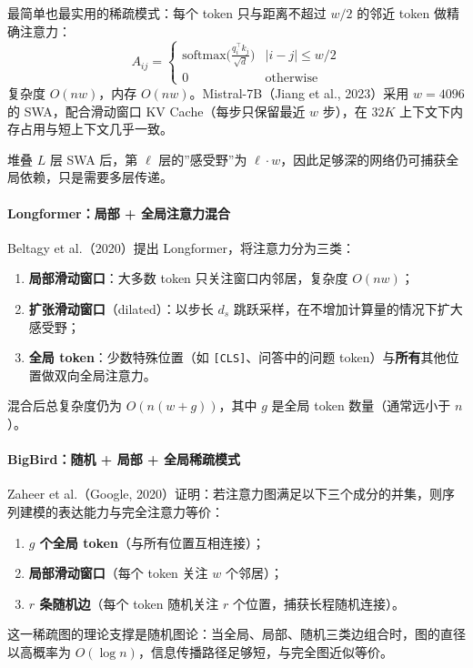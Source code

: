 \documentclass[12pt,a4paper]{article}
\begin{document}
最简单也最实用的稀疏模式：每个 token 只与距离不超过 $w/2$ 的邻近 token 做精确注意力：
\begin{equation}
A_{ij} = \begin{cases}
\mathrm{softmax}\!\bigl(\tfrac{q_i^\top k_j}{\sqrt{d}}\bigr) & |i-j| \le w/2\\
0 & \text{otherwise}
\end{cases}
\end{equation}
复杂度 $O(nw)$，内存 $O(nw)$。Mistral-7B（Jiang et al., 2023）采用 $w=4096$ 的 SWA，配合滑动窗口 KV Cache（每步只保留最近 $w$ 步），在 $32K$ 上下文下内存占用与短上下文几乎一致。

堆叠 $L$ 层 SWA 后，第 $\ell$ 层的”感受野”为 $\ell \cdot w$，因此足够深的网络仍可捕获全局依赖，只是需要多层传递。

\paragraph{Longformer：局部 + 全局注意力混合}

Beltagy et al.（2020）提出 Longformer，将注意力分为三类：
\begin{enumerate}
    \item \textbf{局部滑动窗口}：大多数 token 只关注窗口内邻居，复杂度 $O(nw)$；
    \item \textbf{扩张滑动窗口}（dilated）：以步长 $d_s$ 跳跃采样，在不增加计算量的情况下扩大感受野；
    \item \textbf{全局 token}：少数特殊位置（如 \texttt{[CLS]}、问答中的问题 token）与\textbf{所有}其他位置做双向全局注意力。
\end{enumerate}
混合后总复杂度仍为 $O(n(w + g))$，其中 $g$ 是全局 token 数量（通常远小于 $n$）。

\paragraph{BigBird：随机 + 局部 + 全局稀疏模式}

Zaheer et al.（Google, 2020）证明：若注意力图满足以下三个成分的并集，则序列建模的表达能力与完全注意力等价：
\begin{enumerate}
    \item \textbf{$g$ 个全局 token}（与所有位置互相连接）；
    \item \textbf{局部滑动窗口}（每个 token 关注 $w$ 个邻居）；
    \item \textbf{$r$ 条随机边}（每个 token 随机关注 $r$ 个位置，捕获长程随机连接）。
\end{enumerate}
这一稀疏图的理论支撑是随机图论：当全局、局部、随机三类边组合时，图的直径以高概率为 $O(\log n)$，信息传播路径足够短，与完全图近似等价。
\end{document}
